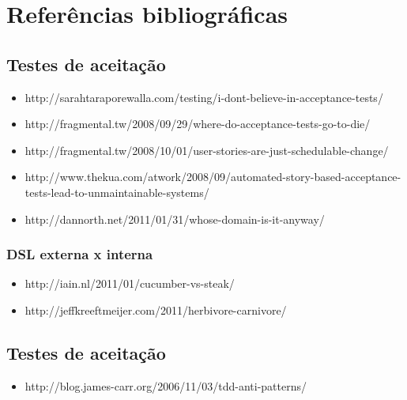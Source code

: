 \chapter{Referências bibliográficas}

\section{Testes de aceitação}

\begin{itemize}
\item http://sarahtaraporewalla.com/testing/i-dont-believe-in-acceptance-tests/
\item http://fragmental.tw/2008/09/29/where-do-acceptance-tests-go-to-die/
\item http://fragmental.tw/2008/10/01/user-stories-are-just-schedulable-change/
\item http://www.thekua.com/atwork/2008/09/automated-story-based-acceptance-tests-lead-to-unmaintainable-systems/
\item http://dannorth.net/2011/01/31/whose-domain-is-it-anyway/
\end{itemize}

\subsection{DSL externa x interna}

\begin{itemize}
\item http://iain.nl/2011/01/cucumber-vs-steak/
\item http://jeffkreeftmeijer.com/2011/herbivore-carnivore/
\end{itemize}

\section{Testes de aceitação}
\begin{itemize}
\item http://blog.james-carr.org/2006/11/03/tdd-anti-patterns/
\end{itemize}


